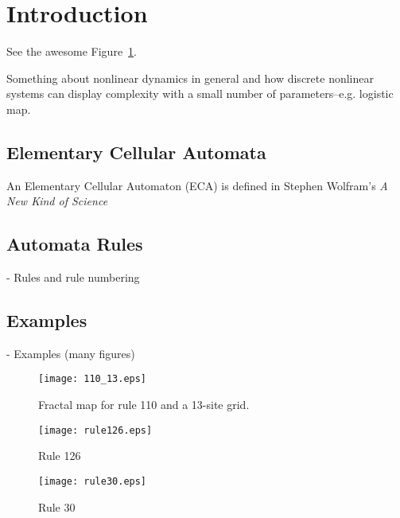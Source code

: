 \section{Introduction}

See the awesome Figure~\ref{110_map}.

Something about nonlinear dynamics in general and how discrete
nonlinear systems can display complexity with a small number of
parameters--e.g. logistic map.

\subsection{Elementary Cellular Automata}

An Elementary Cellular Automaton (ECA) is defined in Stephen Wolfram's
\emph{A New Kind of Science}~\cite{anks}

\subsection{Automata Rules}
- Rules and rule numbering

\subsection{Examples}
- Examples (many figures)

\begin{figure}
    \centering
    \texttt{[image: 110\_13.eps]}
    \caption{\label{110_map} Fractal map for rule 110 and a 13-site grid.}
\end{figure}

\begin{figure}
    \begin{minipage}[b]{0.49\textwidth}
        \centering
        \texttt{[image: rule126.eps]}
        \caption{\label{rule126} Rule 126}
    \end{minipage}
    \hspace{0.5cm}
    \begin{minipage}[b]{0.49\textwidth}
        \centering
        \texttt{[image: rule30.eps]}
        \caption{\label{rule30} Rule 30}
    \end{minipage}
\end{figure}
